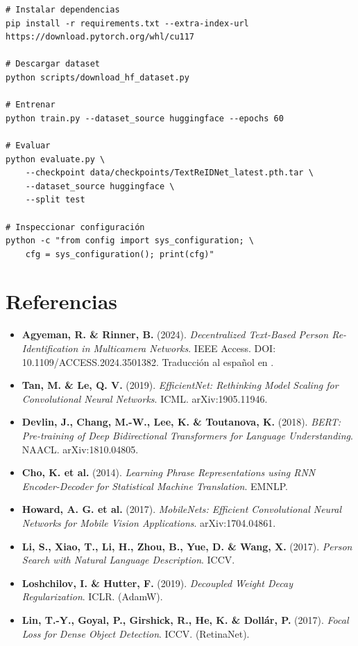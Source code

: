 \begin{verbatim}
# Instalar dependencias
pip install -r requirements.txt --extra-index-url https://download.pytorch.org/whl/cu117

# Descargar dataset
python scripts/download_hf_dataset.py

# Entrenar
python train.py --dataset_source huggingface --epochs 60

# Evaluar
python evaluate.py \
    --checkpoint data/checkpoints/TextReIDNet_latest.pth.tar \
    --dataset_source huggingface \
    --split test

# Inspeccionar configuración
python -c "from config import sys_configuration; \
    cfg = sys_configuration(); print(cfg)"
\end{verbatim}

\section{Referencias}

\begin{itemize}
  \item \textbf{Agyeman, R. \& Rinner, B.} (2024).
    \emph{Decentralized Text-Based Person Re-Identification in
    Multicamera Networks}. IEEE Access.
    DOI: 10.1109/ACCESS.2024.3501382.
    Traducción al español en \file{docs/paper.md}.

  \item \textbf{Tan, M. \& Le, Q. V.} (2019).
    \emph{EfficientNet: Rethinking Model Scaling for
    Convolutional Neural Networks}. ICML.
    arXiv:1905.11946.

  \item \textbf{Devlin, J., Chang, M.-W., Lee, K. \& Toutanova,
    K.} (2018). \emph{BERT: Pre-training of Deep Bidirectional
    Transformers for Language Understanding}. NAACL.
    arXiv:1810.04805.

  \item \textbf{Cho, K. et al.} (2014). \emph{Learning Phrase
    Representations using RNN Encoder-Decoder for Statistical
    Machine Translation}. EMNLP.

  \item \textbf{Howard, A. G. et al.} (2017).
    \emph{MobileNets: Efficient Convolutional Neural Networks
    for Mobile Vision Applications}. arXiv:1704.04861.

  \item \textbf{Li, S., Xiao, T., Li, H., Zhou, B., Yue, D. \&
    Wang, X.} (2017). \emph{Person Search with Natural Language
    Description}. ICCV.

  \item \textbf{Loshchilov, I. \& Hutter, F.} (2019).
    \emph{Decoupled Weight Decay Regularization}. ICLR.
    (AdamW).

  \item \textbf{Lin, T.-Y., Goyal, P., Girshick, R., He, K. \&
    Dollár, P.} (2017). \emph{Focal Loss for Dense Object
    Detection}. ICCV. (RetinaNet).
\end{itemize}
